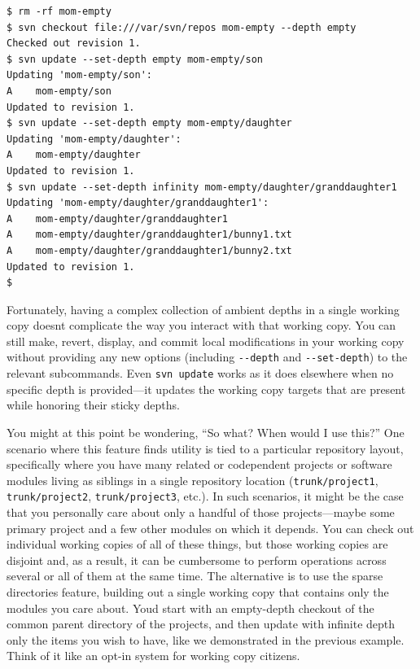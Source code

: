 \begin{verbatim}
$ rm -rf mom-empty
$ svn checkout file:///var/svn/repos mom-empty --depth empty
Checked out revision 1.
$ svn update --set-depth empty mom-empty/son
Updating 'mom-empty/son':
A    mom-empty/son
Updated to revision 1.
$ svn update --set-depth empty mom-empty/daughter
Updating 'mom-empty/daughter':
A    mom-empty/daughter
Updated to revision 1.
$ svn update --set-depth infinity mom-empty/daughter/granddaughter1
Updating 'mom-empty/daughter/granddaughter1':
A    mom-empty/daughter/granddaughter1
A    mom-empty/daughter/granddaughter1/bunny1.txt
A    mom-empty/daughter/granddaughter1/bunny2.txt
Updated to revision 1.
$
\end{verbatim}

Fortunately, having a complex collection of ambient depths in a single
working copy doesn\textquotesingle t complicate the way you interact
with that working copy. You can still make, revert, display, and commit
local modifications in your working copy without providing any new
options (including \texttt{-\/-depth} and \texttt{-\/-set-depth}) to the
relevant subcommands. Even \texttt{svn\ update} works as it does
elsewhere when no specific depth is provided---it updates the working
copy targets that are present while honoring their sticky depths.

You might at this point be wondering, ``So what? When would I use
this?'' One scenario where this feature finds utility is tied to a
particular repository layout, specifically where you have many related
or codependent projects or software modules living as siblings in a
single repository location (\texttt{trunk/project1},
\texttt{trunk/project2}, \texttt{trunk/project3}, etc.). In such
scenarios, it might be the case that you personally care about only a
handful of those projects---maybe some primary project and a few other
modules on which it depends. You can check out individual working copies
of all of these things, but those working copies are disjoint and, as a
result, it can be cumbersome to perform operations across several or all
of them at the same time. The alternative is to use the sparse
directories feature, building out a single working copy that contains
only the modules you care about. You\textquotesingle d start with an
empty-depth checkout of the common parent directory of the projects, and
then update with infinite depth only the items you wish to have, like we
demonstrated in the previous example. Think of it like an opt-in system
for working copy citizens.

